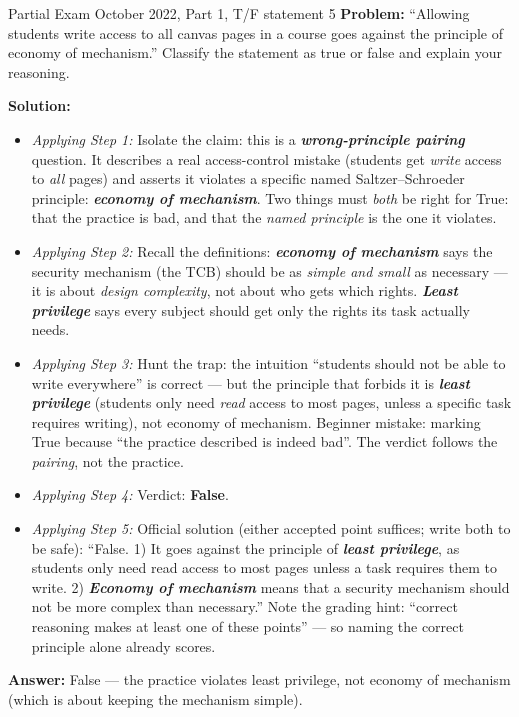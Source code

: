 \documentclass[12pt, a4paper]{article}
\newcommand{\term}[1]{\textbf{\textit{#1}}}        %
\begin{document}
\begin{practicebox}{Partial Exam October 2022, Part 1, T/F statement 5}
\textbf{Problem:} ``Allowing students write access to all canvas pages in a course goes against the principle of economy of mechanism.'' Classify the statement as true or false and explain your reasoning.

\textbf{Solution:}
\begin{itemize}
    \item \textit{Applying Step 1:} Isolate the claim: this is a \term{wrong-principle pairing} question. It describes a real access-control mistake (students get \emph{write} access to \emph{all} pages) and asserts it violates a specific named Saltzer--Schroeder principle: \term{economy of mechanism}. Two things must \emph{both} be right for True: that the practice is bad, and that the \emph{named principle} is the one it violates.
    \item \textit{Applying Step 2:} Recall the definitions: \term{economy of mechanism} says the security mechanism (the TCB) should be as \emph{simple and small} as necessary --- it is about \emph{design complexity}, not about who gets which rights. \term{Least privilege} says every subject should get only the rights its task actually needs.
    \item \textit{Applying Step 3:} Hunt the trap: the intuition ``students should not be able to write everywhere'' is correct --- but the principle that forbids it is \term{least privilege} (students only need \emph{read} access to most pages, unless a specific task requires writing), not economy of mechanism. Beginner mistake: marking True because ``the practice described is indeed bad''. The verdict follows the \emph{pairing}, not the practice.
    \item \textit{Applying Step 4:} Verdict: \textbf{False}.
    \item \textit{Applying Step 5:} Official solution (either accepted point suffices; write both to be safe): ``False. 1) It goes against the principle of \term{least privilege}, as students only need read access to most pages unless a task requires them to write. 2) \term{Economy of mechanism} means that a security mechanism should not be more complex than necessary.'' Note the grading hint: ``correct reasoning makes at least one of these points'' --- so naming the correct principle alone already scores.
\end{itemize}
\textbf{Answer:} False --- the practice violates least privilege, not economy of mechanism (which is about keeping the mechanism simple).
\end{practicebox}
\end{document}

